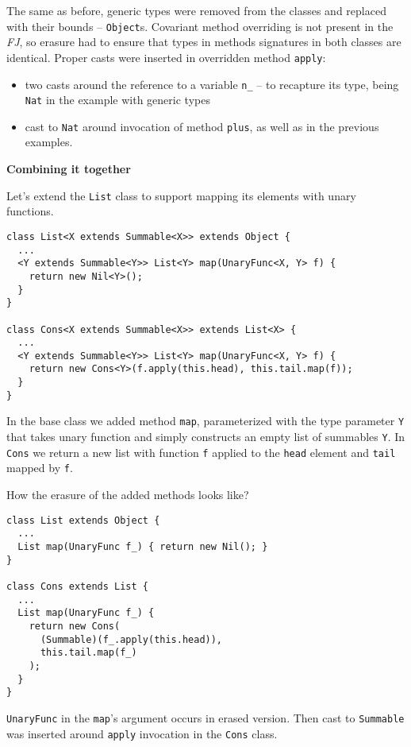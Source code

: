 \documentclass{article}[12pt]
\begin{document}
The same as before, generic types were removed from the classes
and replaced with their bounds -- \texttt{Object}s. Covariant
method overriding is not present in the \emph{FJ}, so erasure had
to ensure that types in methods signatures in both classes are
identical. Proper casts were inserted in overridden method
\texttt{apply}:

\begin{itemize}
\item two casts around the reference to a variable \texttt{n\_} --
  to recapture its type, being \texttt{Nat} in the example with
  generic types
\item cast to \texttt{Nat} around invocation of method
  \texttt{plus}, as well as in the previous examples.
\end{itemize}
\textbf{Combining it together}

Let's extend the \texttt{List} class to support mapping its
elements with unary functions.

\begin{verbatim}
class List<X extends Summable<X>> extends Object {
  ...
  <Y extends Summable<Y>> List<Y> map(UnaryFunc<X, Y> f) {
    return new Nil<Y>();
  }
}

class Cons<X extends Summable<X>> extends List<X> {
  ...
  <Y extends Summable<Y>> List<Y> map(UnaryFunc<X, Y> f) {
    return new Cons<Y>(f.apply(this.head), this.tail.map(f));
  }
}
\end{verbatim}

In the base class we added method \texttt{map}, parameterized with
the type parameter \texttt{Y} that takes unary function and simply
constructs an empty list of summables \texttt{Y}. In \texttt{Cons}
we return a new list with function \texttt{f} applied to the
\texttt{head} element and \texttt{tail} mapped by \texttt{f}.

How the erasure of the added methods looks like?

\begin{verbatim}
class List extends Object {
  ...
  List map(UnaryFunc f_) { return new Nil(); }
}

class Cons extends List {
  ...
  List map(UnaryFunc f_) {
    return new Cons(
      (Summable)(f_.apply(this.head)),
      this.tail.map(f_)
    );     
  }
}
\end{verbatim}

\texttt{UnaryFunc} in the \texttt{map}'s argument occurs in erased
version. Then cast to \texttt{Summable} was inserted around
\texttt{apply} invocation in the \texttt{Cons} class.
\end{document}
